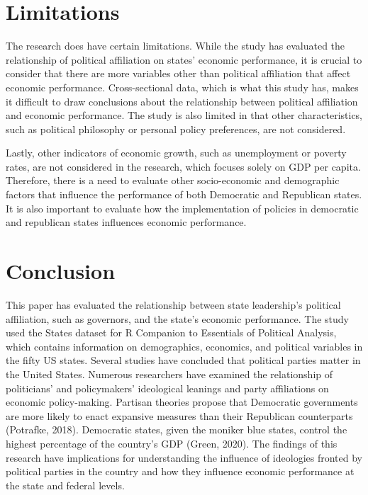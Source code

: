 \documentclass[11pt]{article}
\begin{document}
\section{Limitations}

The research does have certain limitations. While the study has evaluated the relationship of political affiliation on states' economic performance, it is crucial to consider that there are more variables other than political affiliation that affect economic performance. Cross-sectional data, which is what this study has, makes it difficult to draw conclusions about the relationship between political affiliation and economic performance. The study is also limited in that other characteristics, such as political philosophy or personal policy preferences, are not considered.

Lastly, other indicators of economic growth, such as unemployment or poverty rates, are not considered in the research, which focuses solely on GDP per capita. Therefore, there is a need to evaluate other socio-economic and demographic factors that influence the performance of both Democratic and Republican states. It is also important to evaluate how the implementation of policies in democratic and republican states influences economic performance.

\section{Conclusion}

This paper has evaluated the relationship between state leadership's political affiliation, such as governors, and the state's economic performance. The study used the States dataset for R Companion to Essentials of Political Analysis, which contains information on demographics, economics, and political variables in the fifty US states. Several studies have concluded that political parties matter in the United States. Numerous researchers have examined the relationship of politicians' and policymakers' ideological leanings and party affiliations on economic policy-making. Partisan theories propose that Democratic governments are more likely to enact expansive measures than their Republican counterparts (Potrafke, 2018). Democratic states, given the moniker blue states, control the highest percentage of the country's GDP (Green, 2020). The findings of this research have implications for understanding the influence of ideologies fronted by political parties in the country and how they influence economic performance at the state and federal levels.
\end{document}
